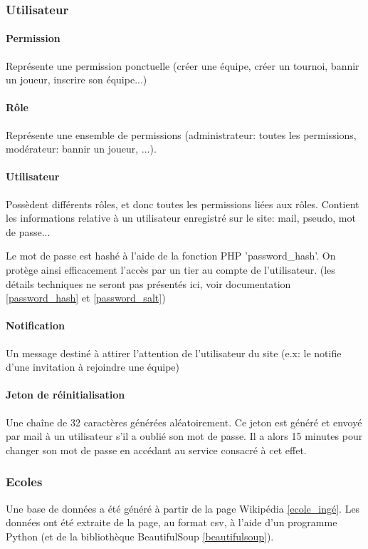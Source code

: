 \documentclass[10pt]{article}
\begin{document}
      \newpage
      \subsubsection{Utilisateur}
	\paragraph{Permission} Représente une permission ponctuelle (créer une équipe, créer un tournoi, bannir un joueur, inscrire son équipe...)
	\paragraph{Rôle} Représente une ensemble de permissions (administrateur: toutes les permissions, modérateur: bannir un joueur, ...).
	\paragraph{Utilisateur} Possèdent différents rôles, et donc toutes les permissions liées aux rôles.
	Contient les informations relative à un utilisateur enregistré sur le site: mail, pseudo, mot de passe...
	
	Le mot de passe est hashé à l'aide de la fonction PHP 'password\_hash'.
	On protège ainsi efficacement l'accès par un tier au compte de l'utilisateur.
	(les détails techniques ne seront pas présentés ici, voir documentation \ref{password_hash} et \ref{password_salt})
	
	\paragraph{Notification} Un message destiné à attirer l'attention de l'utilisateur du site (e.x: le notifie d'une invitation à rejoindre une équipe)
	\paragraph{Jeton de réinitialisation} Une chaîne de 32 caractères générées aléatoirement.
	Ce jeton est généré et envoyé par mail à un utilisateur s'il a oublié son mot de passe.
	Il a alors 15 minutes pour changer son mot de passe en accédant au service consacré à cet effet.
      
      \subsubsection{Ecoles}
	Une base de données a été généré à partir de la page Wikipédia \ref{ecole_ingé}.
	Les données ont été extraite de la page, au format csv, à l'aide d'un programme Python (et de la bibliothèque BeautifulSoup \ref{beautifulsoup}).
	
\end{document}

